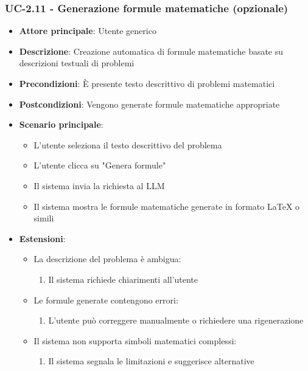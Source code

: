 \documentclass[11pt,a4paper]{article}
\begin{document}
\subsubsection{UC-2.11 - Generazione formule matematiche (opzionale)}
\begin{itemize}
    \item \textbf{Attore principale}: Utente generico
    \item \textbf{Descrizione}: Creazione automatica di formule matematiche basate su descrizioni testuali di problemi
    \item \textbf{Precondizioni}: È presente testo descrittivo di problemi matematici
    \item \textbf{Postcondizioni}: Vengono generate formule matematiche appropriate
    \item \textbf{Scenario principale}:
        \begin{itemize}
            \item L'utente seleziona il testo descrittivo del problema
            \item L'utente clicca su "Genera formule"
            \item Il sistema invia la richiesta al LLM
            \item Il sistema mostra le formule matematiche generate in formato LaTeX o simili
        \end{itemize}
    \item \textbf{Estensioni}:
        \begin{itemize}
            \item La descrizione del problema è ambigua:
                \begin{enumerate}
                    \item Il sistema richiede chiarimenti all'utente
                \end{enumerate}
            \item Le formule generate contengono errori:
                \begin{enumerate}
                    \item L'utente può correggere manualmente o richiedere una rigenerazione
                \end{enumerate}
            \item Il sistema non supporta simboli matematici complessi:
                \begin{enumerate}
                    \item Il sistema segnala le limitazioni e suggerisce alternative
                \end{enumerate}
        \end{itemize}
\end{itemize}
\end{document}
